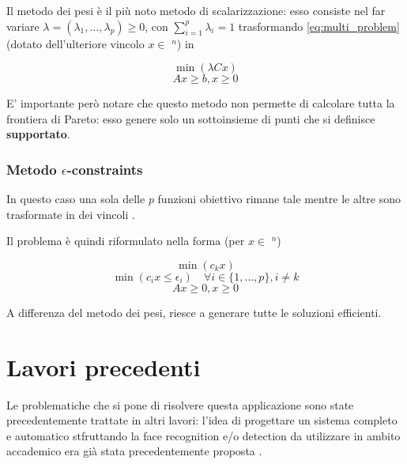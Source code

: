 Il metodo dei pesi è il più noto metodo di scalarizzazione: esso consiste nel far variare 
$\lambda = (\lambda_1, \dots, \lambda_p) \geq 0$, con $\sum_{i=1}^{p} \lambda_i = 1$ trasformando 
\ref{eq:multi_problem} (dotato dell'ulteriore vincolo $x \in$ \Zset$^n$) in 

\begin{equation*}
    \min (\lambda Cx)    
    \label{eq:}
\end{equation*}
\begin{equation*}
    Ax \geq b, x\geq 0
    \label{eq:}
\end{equation*}

E' importante però notare che questo metodo non permette di calcolare tutta la frontiera di Pareto:
esso genere solo un sottoinsieme di punti che si definisce \textbf{supportato}. 

\subsubsection{Metodo $\epsilon$-constraints}
\label{section:epsilon_constraints}

In questo caso una sola delle $p$ funzioni obiettivo rimane tale mentre le altre sono trasformate in 
dei vincoli \cite{Figueira2006}.

Il problema è quindi riformulato nella forma (per $x \in$ \Zset$^n$)

\begin{equation*}
    \min (c_kx)    
    \label{eq:}
\end{equation*}
\begin{equation*}
    \min (c_ix \leq \epsilon_i)  \quad \forall i \in \{1, \dots, p\}, i \neq k   
    \label{eq:}
\end{equation*}
\begin{equation*}
    Ax \geq 0, x \geq 0
    \label{eq:}
\end{equation*}

A differenza del metodo dei pesi, riesce a generare tutte le soluzioni efficienti.

\newpage

\section{Lavori precedenti}
\label{section:past_works}

Le problematiche che si pone di risolvere questa applicazione sono state 
precedentemente trattate in altri lavori: l'idea di progettare un sistema 
completo e automatico stfruttando la face recognition e/o detection
da utilizzare in ambito accademico era già stata precedentemente proposta \cite{Kaw05}
\cite{Kotevski2018} \cite{Pat14} \cite{Sid16}.

